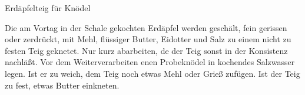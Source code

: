 \begin{recipe}{Erdäpfelteig für Knödel}%

    \begin{ingredients}
    \end{ingredients}

    \begin{instructions}
        Die am Vortag in der Schale gekochten Erdäpfel werden geschält, fein gerissen oder zerdrückt, mit Mehl, flüssiger Butter, Eidotter und Salz zu einem nicht zu festen Teig geknetet.
        Nur kurz abarbeiten, de der Teig sonst in der Konsistenz nachläßt.
        Vor dem Weiterverarbeiten enen Probeknödel in kochendes Salzwasser legen.
        Ist er zu weich, dem Teig noch etwas Mehl oder Grieß zufügen.
        Ist der Teig zu fest, etwas Butter einkneten.
    \end{instructions}
\end{recipe}
